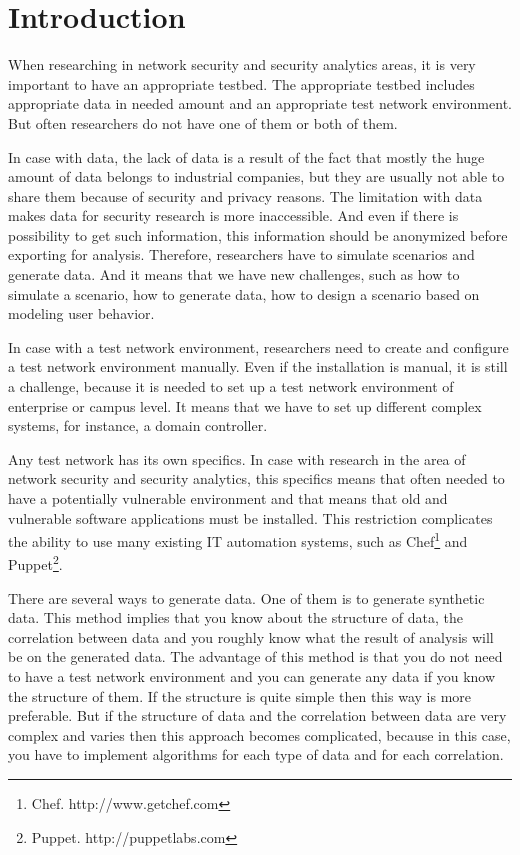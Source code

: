 \section{Introduction}


When researching in network security and security analytics areas, it is very important to have an appropriate testbed. The appropriate testbed includes appropriate data in needed amount and an appropriate test network environment. But often researchers do not have one of them or both of them.  

In case with data, the lack of data is a result of the fact that mostly the huge amount of data belongs to industrial companies, but they are usually not able to share them because of security and privacy reasons. The limitation with data makes data for security research is more inaccessible. And even if there is possibility to get such information, this information should be anonymized before exporting for analysis. Therefore, researchers have to simulate scenarios and generate data. And it means that we have new challenges, such as how to simulate a scenario, how to generate data, how to design a scenario based on modeling user behavior. 

In case with a test network environment, researchers need to create and configure a test network environment manually. Even if the installation is manual, it is still a challenge, because it is needed to set up a test network environment of enterprise or campus level. It means that we have to set up different complex systems, for instance, a domain controller. 

Any test network has its own specifics. In case with research in the area of network security and security analytics, this specifics means that often needed to have a potentially vulnerable environment and that means that old and vulnerable software applications must be installed. This restriction complicates the ability to use many existing IT automation systems, such as Chef\footnote{Chef. http://www.getchef.com} and Puppet\footnote{Puppet. http://puppetlabs.com}. %

There are several ways to generate data. One of them is to generate synthetic data. This method implies that you know about the structure of data, the correlation between data and you roughly know what the result of analysis will be on the generated data. The advantage of this method is that you do not need to have a test network environment and you can generate any data if you know the structure of them. If the structure is quite simple then this way is more preferable. But if the structure of data and the correlation between data are very complex and varies then this approach becomes complicated, because in this case, you have to implement algorithms for each type of data and for each correlation. 

